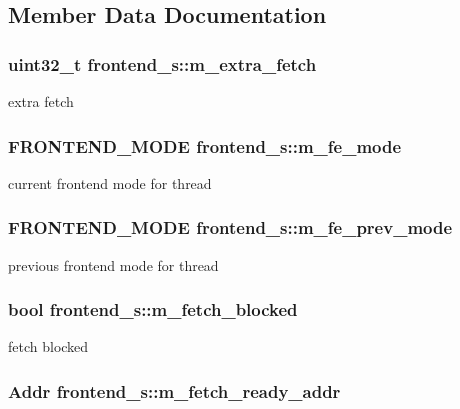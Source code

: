 \subsection{Member Data Documentation}
\hypertarget{structfrontend__s_a3d10c239a82e97daca4ac26337055e85}{
\subsubsection[{m\_\-extra\_\-fetch}]{\setlength{\rightskip}{0pt plus 5cm}uint32\_\-t {\bf frontend\_\-s::m\_\-extra\_\-fetch}}}
\label{structfrontend__s_a3d10c239a82e97daca4ac26337055e85}
extra fetch \hypertarget{structfrontend__s_adf08ea8a939c74abbd38f5b20f478afb}{
\subsubsection[{m\_\-fe\_\-mode}]{\setlength{\rightskip}{0pt plus 5cm}FRONTEND\_\-MODE {\bf frontend\_\-s::m\_\-fe\_\-mode}}}
\label{structfrontend__s_adf08ea8a939c74abbd38f5b20f478afb}
current frontend mode for thread \hypertarget{structfrontend__s_a47a245627b16da594ae17822dfba1fa3}{
\subsubsection[{m\_\-fe\_\-prev\_\-mode}]{\setlength{\rightskip}{0pt plus 5cm}FRONTEND\_\-MODE {\bf frontend\_\-s::m\_\-fe\_\-prev\_\-mode}}}
\label{structfrontend__s_a47a245627b16da594ae17822dfba1fa3}
previous frontend mode for thread \hypertarget{structfrontend__s_a552f1819ab43b5fa3388bc4f334954ce}{
\subsubsection[{m\_\-fetch\_\-blocked}]{\setlength{\rightskip}{0pt plus 5cm}bool {\bf frontend\_\-s::m\_\-fetch\_\-blocked}}}
\label{structfrontend__s_a552f1819ab43b5fa3388bc4f334954ce}
fetch blocked \hypertarget{structfrontend__s_a10ac2fa31ffde8759fc710b754041e3e}{
\subsubsection[{m\_\-fetch\_\-ready\_\-addr}]{\setlength{\rightskip}{0pt plus 5cm}Addr {\bf frontend\_\-s::m\_\-fetch\_\-ready\_\-addr}}}
